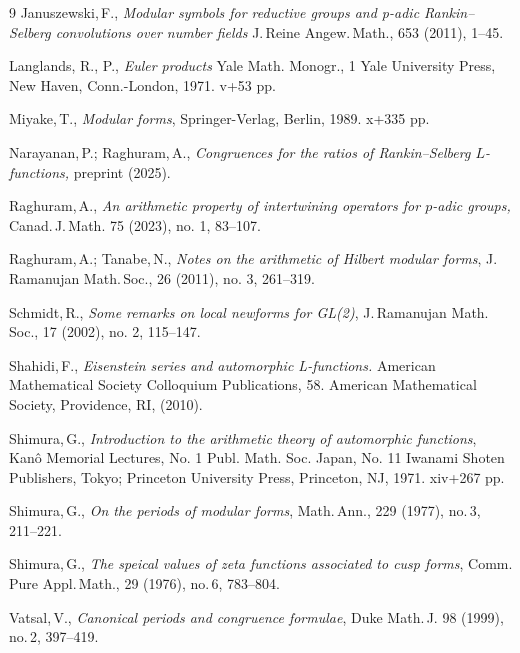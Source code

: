 \documentclass[11pt]{amsart}
\begin{document}
\begin{thebibliography}{9}
 \smallskip	
{} 
{\sc Januszewski,\,F.,} 
\textit{Modular symbols for reductive groups and p-adic Rankin--Selberg convolutions over number fields}
J.\,Reine Angew.\,Math.,  653 (2011), 1--45.

\smallskip
{}
{\sc Langlands, R., P.,}
\textit{Euler products}
Yale Math. Monogr., 1
Yale University Press, New Haven, Conn.-London, 1971. v+53 pp.


 \smallskip
{} 
{\sc Miyake,\,T.,}
\textit{Modular forms}, Springer-Verlag, Berlin, 1989. x+335 pp.
	
 \smallskip	
{} 
{\sc Narayanan,\,P.; Raghuram,\,A.,}
\textit{Congruences for the ratios of Rankin--Selberg $L$-functions,} preprint (2025).
		
 \smallskip
{\sc Raghuram,\,A.,}
 {\it An arithmetic property of intertwining operators for  $p$-adic groups,}
Canad.\,J.\,Math. 75 (2023), no. 1, 83--107.

 \smallskip
{} 
{\sc Raghuram,\,A.; Tanabe,\,N.,}
\textit{Notes on the arithmetic of Hilbert modular forms},
J.\,Ramanujan Math.\,Soc., 26 (2011), no. 3, 261--319.
		
 \smallskip	
{} 
{\sc Schmidt,\,R.,} 
\textit{Some remarks on local newforms for GL(2)},
J.\,Ramanujan Math.\,Soc., 17 (2002), no. 2, 115--147.


\smallskip
{}
{\sc Shahidi,\,F.,}
{\it Eisenstein series and automorphic L-functions.} 
American Mathematical Society Colloquium Publications, 58. 
American Mathematical Society, Providence, RI, (2010). 


 \smallskip		
{} 
{\sc Shimura,\,G.,}
\textit{Introduction to the arithmetic theory of automorphic functions}, 
Kanô Memorial Lectures, No. 1
Publ. Math. Soc. Japan, No. 11
Iwanami Shoten Publishers, Tokyo; Princeton University Press, Princeton, NJ, 1971. xiv+267 pp.

 \smallskip		
{} 
{\sc Shimura,\,G.,} 
\textit{On the periods of modular forms},
Math.\,Ann., 229 (1977), no.\,3, 211--221.
	
 \smallskip	
{} 
{\sc Shimura,\,G.,} 
\textit{The speical values of zeta functions associated to cusp forms}, 
Comm. Pure Appl.\,Math., 29 (1976), no.\,6, 783--804.
	
 \smallskip	
{} 
{\sc Vatsal,\,V.,}
\textit{Canonical periods and congruence formulae}, 
Duke Math.\,J. 98 (1999), no.\,2, 397--419.		

\end{thebibliography}
\end{document}
